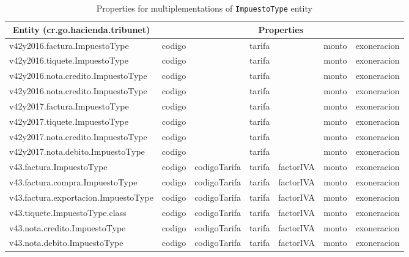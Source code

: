 \documentclass{article}
\begin{document}
\begin{table}[ht]
\centering
\begin{tabular}{@{}lllllll@{}}
\toprule
\multicolumn{1}{c}{Entity (cr.go.hacienda.tribunet)} & \multicolumn{6}{c}{Properties}                                   \\
\midrule
v42y2016.factura.ImpuestoType                        & codigo &              & tarifa &           & monto & exoneracion \\
v42y2016.tiquete.ImpuestoType                        & codigo &              & tarifa &           & monto & exoneracion \\
v42y2016.nota.credito.ImpuestoType                   & codigo &              & tarifa &           & monto & exoneracion \\
v42y2016.nota.credito.ImpuestoType                   & codigo &              & tarifa &           & monto & exoneracion \\
v42y2017.factura.ImpuestoType                        & codigo &              & tarifa &           & monto & exoneracion \\
v42y2017.tiquete.ImpuestoType                        & codigo &              & tarifa &           & monto & exoneracion \\
v42y2017.nota.credito.ImpuestoType                   & codigo &              & tarifa &           & monto & exoneracion \\
v42y2017.nota.debito.ImpuestoType                    & codigo &              & tarifa &           & monto & exoneracion \\
v43.factura.ImpuestoType                             & codigo & codigoTarifa & tarifa & factorIVA & monto & exoneracion \\
v43.factura.compra.ImpuestoType                      & codigo & codigoTarifa & tarifa & factorIVA & monto & exoneracion \\
v43.factura.exportacion.ImpuestoType                 & codigo & codigoTarifa & tarifa & factorIVA & monto & exoneracion \\
v43.tiquete.ImpuestoType.class                       & codigo & codigoTarifa & tarifa & factorIVA & monto & exoneracion \\
v43.nota.credito.ImpuestoType                        & codigo & codigoTarifa & tarifa & factorIVA & monto & exoneracion \\
v43.nota.debito.ImpuestoType                         & codigo & codigoTarifa & tarifa & factorIVA & monto & exoneracion \\
\bottomrule
\end{tabular}
\caption{Properties for multiplementations of \texttt{ImpuestoType} entity}
\label{tbl:ImpuestoTypeProperties}
\end{table}
\end{document}
